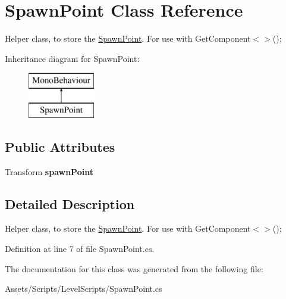 \hypertarget{class_spawn_point}{\section{Spawn\+Point Class Reference}
\label{class_spawn_point}
}


Helper class, to store the \hyperlink{class_spawn_point}{Spawn\+Point}. For use with Get\+Component$<$$>$();  


Inheritance diagram for Spawn\+Point\+:\begin{figure}[H]
\begin{center}
\leavevmode
\includegraphics[height=2.000000cm]{class_spawn_point}
\end{center}
\end{figure}
\subsection*{Public Attributes}
\begin{DoxyCompactItemize}
\item 
\hypertarget{class_spawn_point_a1bbcf616b90a7e757535911a313fb838}{Transform {\bfseries spawn\+Point}}\label{class_spawn_point_a1bbcf616b90a7e757535911a313fb838}

\end{DoxyCompactItemize}


\subsection{Detailed Description}
Helper class, to store the \hyperlink{class_spawn_point}{Spawn\+Point}. For use with Get\+Component$<$$>$(); 



Definition at line 7 of file Spawn\+Point.\+cs.



The documentation for this class was generated from the following file\+:\begin{DoxyCompactItemize}
\item 
Assets/\+Scripts/\+Level\+Scripts/Spawn\+Point.\+cs\end{DoxyCompactItemize}
